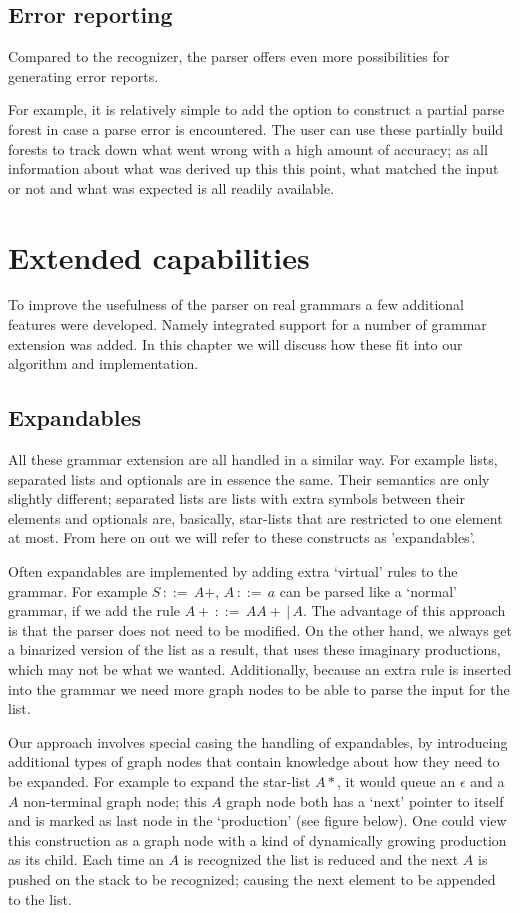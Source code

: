\documentclass[a4paper,10pt]{article}
\begin{document}
\subsection{Error reporting}

Compared to the recognizer, the parser offers even more possibilities for generating error reports.

For example, it is relatively simple to add the option to construct a partial parse forest in case a parse error is encountered. The user can use these partially build forests to track down what went wrong with a high amount of accuracy; as all information about what was derived up this this point, what matched the input or not and what was expected is all readily available.

\section{Extended capabilities}

To improve the usefulness of the parser on real grammars a few additional features were developed. Namely integrated support for a number of grammar extension was added. In this chapter we will discuss how these fit into our algorithm and implementation.

\subsection{Expandables}

All these grammar extension are all handled in a similar way. For example lists, separated lists and optionals are in essence the same. Their semantics are only slightly different; separated lists are lists with extra symbols between their elements and optionals are, basically, star-lists that are restricted to one element at most. From here on out we will refer to these constructs as 'expandables'.

Often expandables are implemented by adding extra `virtual' rules to the grammar. For example $S\,::=\,A+,\,A\,::=\,a$ can be parsed like a `normal' grammar, if we add the rule $A+\,::=\,AA+\,|\,A$. The advantage of this approach is that the parser does not need to be modified. On the other hand, we always get a binarized version of the list as a result, that uses these imaginary productions, which may not be what we wanted. Additionally, because an extra rule is inserted into the grammar we need more graph nodes to be able to parse the input for the list.

Our approach involves special casing the handling of expandables, by introducing additional types of graph nodes that contain knowledge about how they need to be expanded. For example to expand the star-list $A*$, it would queue an $\epsilon$ and a $A$ non-terminal graph node; this $A$ graph node both has a `next' pointer to itself and is marked as last node in the `production' (see figure below). One could view this construction as a graph node with a kind of dynamically growing production as its child. Each time an $A$ is recognized the list is reduced and the next $A$ is pushed on the stack to be recognized; causing the next element to be appended to the list.
\end{document}
